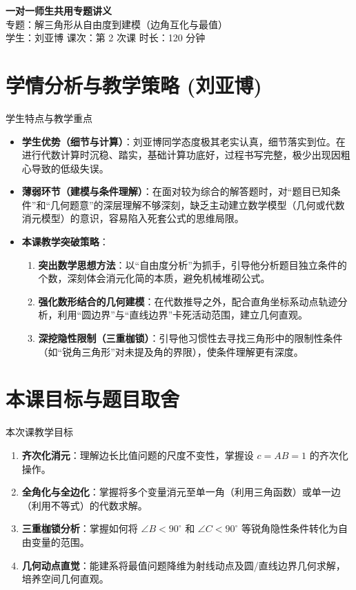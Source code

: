 \documentclass[11pt,a4paper]{ctexart}
\begin{document}
\begin{center}
  {\Large\bfseries 一对一师生共用专题讲义}\\
  \vspace{0.4em}
  {\large 专题：解三角形从自由度到建模（边角互化与最值）}\\
  \vspace{0.3em}
  {\small 学生：刘亚博 \quad 课次：第 2 次课 \quad 时长：120 分钟}
\end{center}

\section{学情分析与教学策略 (刘亚博)}

\begin{teachbox}{学生特点与教学重点}
  \begin{itemize}
    \item \textbf{学生优势（细节与计算）}：刘亚博同学态度极其老实认真，细节落实到位。在进行代数计算时沉稳、踏实，基础计算功底好，过程书写完整，极少出现因粗心导致的低级失误。
    \item \textbf{薄弱环节（建模与条件理解）}：在面对较为综合的解答题时，对“题目已知条件”和“几何题意”的深层理解不够深刻，缺乏主动建立数学模型（几何或代数消元模型）的意识，容易陷入死套公式的思维局限。
    \item \textbf{本课教学突破策略}：
      \begin{enumerate}
        \item \textbf{突出数学思想方法}：以“自由度分析”为抓手，引导他分析题目独立条件的个数，深刻体会消元化简的本质，避免机械堆砌公式。
        \item \textbf{强化数形结合的几何建模}：在代数推导之外，配合直角坐标系动点轨迹分析，利用“圆边界”与“直线边界”卡死活动范围，建立几何直观。
        \item \textbf{深挖隐性限制（三重枷锁）}：引导他习惯性去寻找三角形中的限制性条件（如“锐角三角形”对未提及角的界限），使条件理解更有深度。
      \end{enumerate}
  \end{itemize}
\end{teachbox}

\section{本课目标与题目取舍}

\begin{teachbox}{本次课教学目标}
  \begin{enumerate}
    \item \textbf{齐次化消元}：理解边长比值问题的尺度不变性，掌握设 $c=AB=1$ 的齐次化操作。
    \item \textbf{全角化与全边化}：掌握将多个变量消元至单一角（利用三角函数）或单一边（利用不等式）的代数求解。
    \item \textbf{三重枷锁分析}：掌握如何将 $\angle B < 90^\circ$ 和 $\angle C < 90^\circ$ 等锐角隐性条件转化为自由变量的范围。
    \item \textbf{几何动点直觉}：能建系将最值问题降维为射线动点及圆/直线边界几何求解，培养空间几何直观。
  \end{enumerate}
\end{teachbox}
\end{document}
